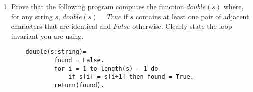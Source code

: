 \documentclass[10pt]{article}
\begin{document}
\begin{enumerate}

\addtocounter{enumi}{2}
\item
Prove that the following program computes the function $double(s)$ where, for any string $s$, $double(s) = True$ if $s$ contains at least one pair of adjacent characters that are identical and $False$ otherwise.  Clearly state the loop invariant you are using.
\begin{verbatim}
    double(s:string)=
            found = False.
            for i = 1 to length(s) - 1 do
                if s[i] = s[i+1] then found = True.
            return(found).
\end{verbatim}

\end{enumerate}
\end{document}
